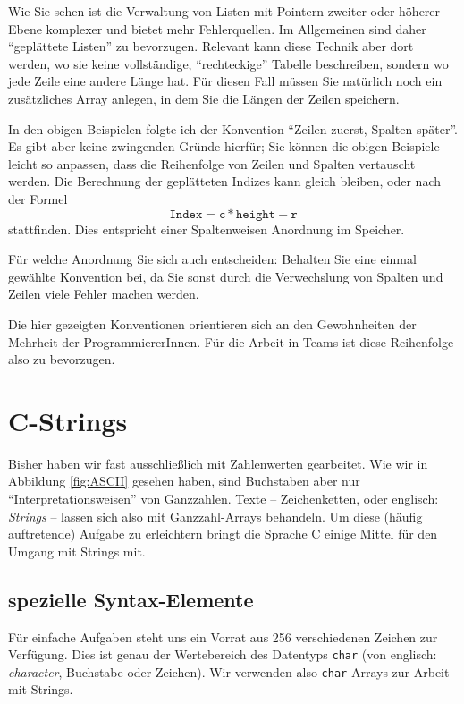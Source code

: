 \begin{hintbox}
Wie Sie sehen ist die Verwaltung von Listen mit Pointern zweiter oder höherer Ebene komplexer und bietet mehr Fehlerquellen. Im Allgemeinen sind daher \enquote{geplättete Listen} zu bevorzugen. Relevant kann diese Technik aber dort werden, wo sie keine vollständige, \enquote{rechteckige} Tabelle beschreiben, sondern wo jede Zeile eine andere Länge hat. Für diesen Fall müssen Sie natürlich noch ein zusätzliches Array anlegen, in dem Sie die Längen der Zeilen speichern.
\end{hintbox}

\begin{hintbox}
In den obigen Beispielen folgte ich der Konvention \enquote{Zeilen zuerst, Spalten später}. Es gibt aber keine zwingenden Gründe hierfür; Sie können die obigen Beispiele leicht so anpassen, dass die Reihenfolge von Zeilen und Spalten vertauscht werden. Die Berechnung der geplätteten Indizes kann gleich bleiben, oder nach der Formel
\[ \mathtt{Index = c * height + r} \]
stattfinden. Dies entspricht einer Spaltenweisen Anordnung im Speicher.

Für welche Anordnung Sie sich auch entscheiden: Behalten Sie eine einmal gewählte Konvention bei, da Sie sonst durch die Verwechslung von Spalten und Zeilen viele Fehler machen werden.

Die hier gezeigten Konventionen orientieren sich an den Gewohnheiten der Mehrheit der ProgrammiererInnen. Für die Arbeit in Teams ist diese Reihenfolge also zu bevorzugen.
\end{hintbox}

\section{C-Strings} \label{sec:string}
Bisher haben wir fast ausschließlich mit Zahlenwerten gearbeitet. Wie wir in Abbildung \ref{fig:ASCII} gesehen haben, sind Buchstaben aber nur \enquote{Interpretationsweisen} von Ganzzahlen. Texte -- Zeichenketten, oder englisch: \emph{Strings} -- lassen sich also mit Ganzzahl-Arrays behandeln. Um diese (häufig auftretende) Aufgabe zu erleichtern bringt die Sprache C einige Mittel für den Umgang mit Strings mit.

\subsection{spezielle Syntax-Elemente}
Für einfache Aufgaben steht uns ein Vorrat aus 256 verschiedenen Zeichen zur Verfügung. Dies ist genau der Wertebereich des Datentyps \texttt{char} (von englisch: \emph{character}, Buchstabe oder Zeichen). Wir verwenden also \texttt{char}-Arrays zur Arbeit mit Strings.

